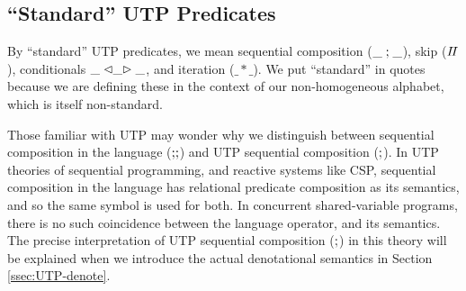 \subsection{``Standard'' UTP Predicates}

By ``standard'' UTP predicates,
we mean sequential composition ($\_\mathrel{;}\_$), skip ($I\!I$),
conditionals $\_\mathrel{\lhd{\_}\rhd}\_$, and iteration ($\_*\_$).
We put ``standard'' in quotes because we are defining these
in the context of our non-homogeneous alphabet,
which is itself non-standard.

Those familiar with UTP may wonder why we distinguish between
sequential composition in the language ($\mathbin{;\!;}$)
and UTP sequential composition ($\mathrel{;}$).
In UTP theories of sequential programming,
and reactive systems like CSP, sequential composition
in the language has relational predicate composition
as its semantics,
and so the same symbol is used for both.
In concurrent shared-variable programs,
there is no such coincidence between the language operator,
and its semantics.
The precise interpretation of UTP sequential composition ($\mathrel{;}$)
in this theory will be explained when we introduce the
actual denotational semantics in Section \ref{ssec:UTP-denote}.

